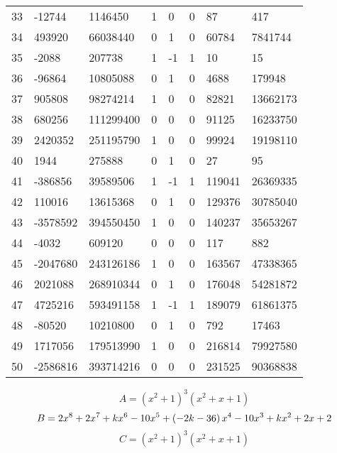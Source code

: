 \documentclass{amsart}
\begin{document}
\begin{longtable}{|l|l|l|lllll|}
33&-12744&1146450&1&0&0&87&417\\
34&493920&66038440&0&1&0&60784&7841744\\
35&-2088&207738&1&-1&1&10&15\\
36&-96864&10805088&0&1&0&4688&179948\\
37&905808&98274214&1&0&0&82821&13662173\\
38&680256&111299400&0&0&0&91125&16233750\\
39&2420352&251195790&1&0&0&99924&19198110\\
40&1944&275888&0&1&0&27&95\\
41&-386856&39589506&1&-1&1&119041&26369335\\
42&110016&13615368&0&1&0&129376&30785040\\
43&-3578592&394550450&1&0&0&140237&35653267\\
44&-4032&609120&0&0&0&117&882\\
45&-2047680&243126186&1&0&0&163567&47338365\\
46&2021088&268910344&0&1&0&176048&54281872\\
47&4725216&593491158&1&-1&1&189079&61861375\\
48&-80520&10210800&0&1&0&792&17463\\
49&1717056&179513990&1&0&0&216814&79927580\\
50&-2586816&393714216&0&0&0&231525&90368838\\
\hline
\end{longtable}
$$A=(x^2
 + 1)^{3}(x^2
 + x
 + 1)$$
$$B=2\*x^8
 + 2\*x^7
 + k\*x^6
 - 10\*x^5
 + \left(-2\*k
 - 36\right) \*x^4
 - 10\*x^3
 + k\*x^2
 + 2\*x
 + 2$$
$$C=(x^2
 + 1)^{3}(x^2
 + x
 + 1)$$
\end{document}
